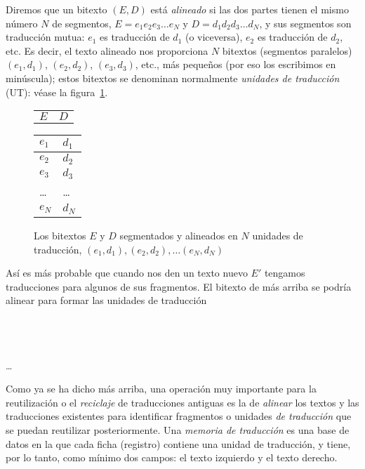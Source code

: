 Diremos que un bitexto $(E,D)$ está \emph{alineado} si las dos partes tienen el mismo número $N$ de segmentos, $E= e_1 e_2 e_3 \ldots e_N$ y $D= d_1 d_2 d_3 \ldots d_N$, y sus segmentos son traducción mutua: $e_1$ es traducción de $d_1$ (o viceversa), $e_2$ es traducción de $d_2$, etc. Es decir, el texto alineado nos proporciona $N$ bitextos (segmentos paralelos) $(e_1,d_1)$, $(e_2,d_2)$, $(e_3,d_3)$, etc., más pequeños (por eso los escribimos en minúscula); estos bitextos se denominan normalmente \emph{unidades de traducción} (UT): véase la figura~\ref{fg:alineat}. \begin{figure} \begin{center} \begin{tabular}{p{3cm}p{3cm}} $E$ &$D$ \end{tabular} \begin{tabular}{|p{3cm}|p{3cm}|} \hline

$e_1$ &$d_1$ \\\hline $e_2$ &$d_2$ \\\hline $e_3$ &$d_3$ \\\hline \ldots &\ldots \\\hline $e_N$ &$d_N$ \\\hline \end{tabular} \end{center} \caption{Los bitextos $E$ y $D$ segmentados y alineados en $N$ unidades de traducción, $(e_1,d_1), (e_2,d_2), \ldots (e_N,d_N)$} \label{fg:alineat} \end{figure} 

Así es más probable que cuando nos den un texto nuevo $E'$ tengamos traducciones para algunos de sus fragmentos. El bitexto de más arriba se podría alinear para formar las unidades de traducción \begin{center} \\ \\ \\ \ldots\\  \end{center} 

Como ya se ha dicho más arriba, una operación muy importante para la reutilización o el \emph{reciclaje} de traducciones antiguas es la de \emph{alinear} los textos y las traducciones existentes para identificar fragmentos o unidades \emph{de traducción} que se puedan reutilizar posteriormente. Una \emph{memoria de traducción} es una base de datos en la que cada ficha (registro) contiene una unidad de traducción, y tiene, por lo tanto, como mínimo dos campos: el texto izquierdo y el texto derecho. 


